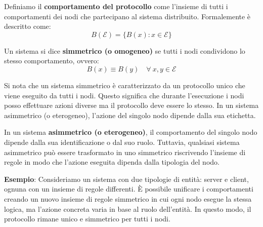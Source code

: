 \begin{definizione}
    Definiamo il \textbf{comportamento del protocollo} come l'insieme di tutti i comportamenti dei nodi che partecipano al sistema distribuito. Formalemente è descritto come:
    \[
    B(\mathcal{E}) = \{B(x) : x \in \mathcal{E}\}
    \]

    Un sistema si dice \textbf{simmetrico (o omogeneo)} se tutti i nodi condividono lo stesso comportamento, ovvero:
    \[
    B(x) \equiv B(y)\quad \forall\ x, y \in \mathcal{E}
    \]

    Si nota che un sistema simmetrico è caratterizzato da un protocollo unico che viene eseguito da tutti i nodi. Questo significa che durante l'esecuzione i nodi posso effettuare azioni diverse ma il protocollo deve essere lo stesso. In un sistema asimmetrico (o eterogeneo), l'azione del singolo nodo dipende dalla sua etichetta.

    In un sistema \textbf{asimmetrico (o eterogeneo)}, il comportamento del singolo nodo dipende dalla sua identificazione o dal suo ruolo. Tuttavia, qualsiasi sistema asimmetrico può essere trasformato in uno simmetrico riscrivendo l'insieme di regole in modo che l'azione eseguita dipenda dalla tipologia del nodo.

    \textbf{Esempio}: Consideriamo un sistema con due tipologie di entità: server e client, ognuna con un insieme di regole differenti. È possibile unificare i comportamenti creando un nuovo insieme di regole simmetrico in cui ogni nodo esegue la stessa logica, ma l'azione concreta varia in base al ruolo dell'entità. In questo modo, il protocollo rimane unico e simmetrico per tutti i nodi.
\end{definizione}

